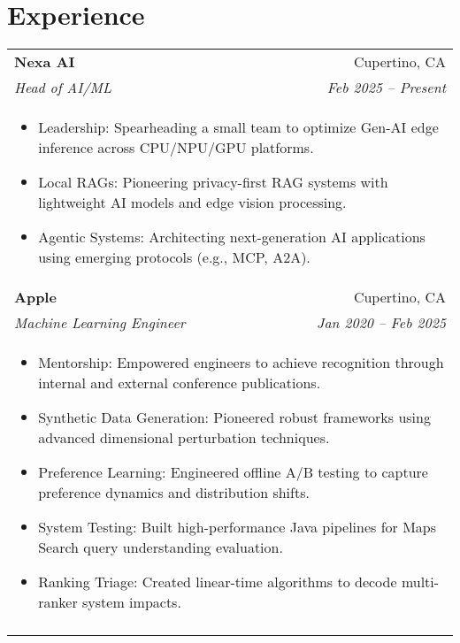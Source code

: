 \documentclass[letterpaper,11pt]{article}
\begin{document}
\section{Experience}
\begin{tabular*}{0.97\textwidth}[t]{l@{\extracolsep{\fill}}r}
  \textbf{Nexa AI} & Cupertino, CA \\
  \textit{\small Head of AI/ML} & \textit{\small Feb 2025 -- Present} \\
  \multicolumn{2}{l}{
    \begin{minipage}{\textwidth}
      \vspace{0.3em}
      \begin{itemize}[leftmargin=*, itemsep=-4.5pt, topsep=0pt, label={\raisebox{0.4ex}{\tiny\textbullet}}]
        \item  Leadership: Spearheading a small team to optimize Gen-AI edge inference across CPU/NPU/GPU platforms.
        \item  Local RAGs: Pioneering privacy-first RAG systems with lightweight AI models and edge vision processing.
        \item  Agentic Systems: Architecting next-generation AI applications using emerging protocols (e.g., MCP, A2A).
      \end{itemize}
    \end{minipage}
  } \\
  \noalign{\vspace{0.7em}}

  \textbf{Apple} & Cupertino, CA \\
  \textit{\small Machine Learning Engineer} & \textit{\small Jan 2020 -- Feb 2025} \\
  \multicolumn{2}{l}{
    \begin{minipage}{\textwidth}
      \vspace{0.3em}
      \begin{itemize}[leftmargin=*, itemsep=-4.5pt, topsep=0pt, label={\raisebox{0.4ex}{\tiny\textbullet}}]       
        \item  Mentorship: Empowered engineers to achieve recognition through internal and external conference publications.
        \item  Synthetic Data Generation: Pioneered robust frameworks using advanced dimensional perturbation techniques.
        \item  Preference Learning: Engineered offline A/B testing to capture preference dynamics and distribution shifts.
        \item  System Testing: Built high-performance Java pipelines for Maps Search query understanding evaluation.
        \item  Ranking Triage: Created linear-time algorithms to decode multi-ranker system impacts.
      \end{itemize}
    \end{minipage}
  } \\
  \noalign{\vspace{0.7em}}


\end{tabular*}
\end{document}
